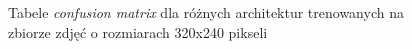 \documentclass[polish,12pt]{aghthesis}
\begin{document}
\begin{figure}[H]%
    \ContinuedFloat
    \begin{adjustbox}{minipage=1.0\paperwidth, pagecenter}
    \centering
    \qquad
    \end{adjustbox}
\end{figure}
\begin{figure}[h!]%
    \ContinuedFloat
    \begin{adjustbox}{minipage=1.0\paperwidth, pagecenter}
    \centering
    \end{adjustbox}
    \label{fig:sigmoid-320-240-matrices}
    \caption{Tabele \textit{confusion matrix} dla różnych architektur trenowanych na zbiorze zdjęć o rozmiarach 320x240 pikseli}
\end{figure}
\end{document}
